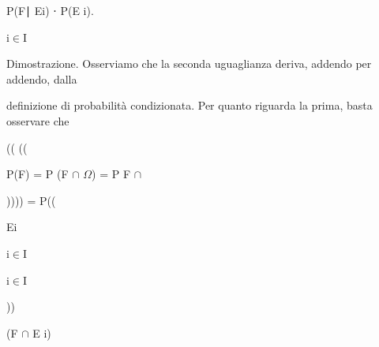 \documentclass[a4paper,portrait,12pt]{article}
\begin{document}
\begin{flushleft}
P(F∣ Ei) ⋅ P(E i).
\end{flushleft}


\begin{flushleft}
i$\in$I
\end{flushleft}





\begin{flushleft}
Dimostrazione. Osserviamo che la seconda uguaglianza deriva, addendo per addendo, dalla
\end{flushleft}


\begin{flushleft}
definizione di probabilit\`{a} condizionata. Per quanto riguarda la prima, basta osservare che
\end{flushleft}





(( ((





\begin{flushleft}
P(F) = P (F $\cap$ $\Omega$) = P F $\cap$
\end{flushleft}





\begin{flushleft}
)))) = P((
\end{flushleft}





\begin{flushleft}
Ei
\end{flushleft}


\begin{flushleft}
i$\in$I
\end{flushleft}





\begin{flushleft}
i$\in$I
\end{flushleft}





))





\begin{flushleft}
(F $\cap$ E i)
\end{flushleft}
\end{document}
